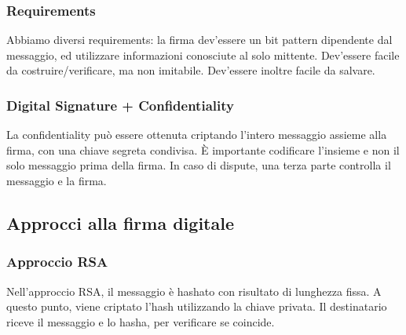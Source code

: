 \documentclass[11pt]{article}
\begin{document}
\subsubsection{Requirements}
Abbiamo diversi requirements: la firma dev'essere un bit pattern dipendente dal messaggio, ed utilizzare informazioni conosciute al solo mittente. Dev'essere facile da costruire/verificare, ma non imitabile. Dev'essere inoltre facile da salvare.
\subsubsection{Digital Signature + Confidentiality}
La confidentiality può essere ottenuta criptando l'intero messaggio assieme alla firma, con una chiave segreta condivisa. È importante codificare l'insieme e non il solo messaggio prima della firma. In caso di dispute, una terza parte controlla il messaggio e la firma.
\subsection{Approcci alla firma digitale}
\subsubsection{Approccio RSA}
Nell'approccio RSA, il messaggio è hashato con risultato di lunghezza fissa. A questo punto, viene criptato l'hash utilizzando la chiave privata. Il destinatario riceve il messaggio e lo hasha, per verificare se coincide.
\end{document}
